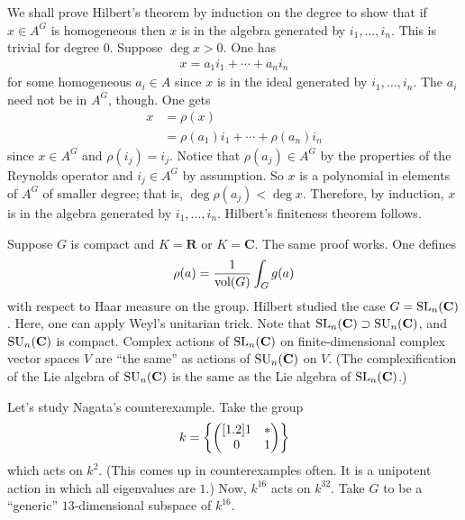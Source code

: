 \documentclass[11pt, oneside,margin=1in]{article}
\begin{document}
We shall prove Hilbert's theorem by induction on the degree to show that if $x\in A^G$ is homogeneous then $x$ is in the algebra generated by $i_1,\hdots,i_n$. This is trivial for degree $0$. Suppose $\deg x > 0$. One has
\begin{align*}
	x=a_1i_1 + \cdots +a_ni_n
\end{align*}
for some homogeneous $a_i\in A$ since $x$ is in the ideal generated by $i_1,\hdots, i_n$. The $a_i$ need not be in $A^G$, though. One gets
\begin{align*}
	x &= \rho(x)\\ 
	  &= \rho(a_1)i_1 + \cdots +\rho(a_n)i_n
\end{align*}
since $x\in A^G$ and $\rho(i_j)=i_j$. Notice that $\rho(a_j) \in A^G$ by the properties of the Reynolds operator and $i_j\in A^G$ by assumption. So $x$ is a polynomial in elements of $A^G$ of smaller degree; that is, $\deg \rho(a_j)<\deg x$. Therefore, by induction, $x$ is in the algebra generated by $i_1,\hdots, i_n$. Hilbert's finiteness theorem follows.

Suppose $G$ is compact and $K=\mathbf{R}$ or $K=\mathbf{C}$. The same proof works. One defines 
\begin{align*}
	\rho(a) = \frac{1}{\operatorname{vol} (G)}\int_{G}^{} g(a) 
\end{align*}		
with respect to Haar measure on the group. Hilbert studied the case $G=\operatorname{SL}_{n}(\mathbf{C})$. Here, one can apply Weyl's unitarian trick. Note that $\operatorname{SL}_{n}(\mathbf{C})\supset \operatorname{SU}_n(\mathbf{C})$, and $\operatorname{SU}_n(\mathbf{C})$ is compact. Complex actions of $\operatorname{SL}_{n}(\mathbf{C})$ on finite-dimensional complex vector spaces $V$ are ``the same'' as actions of $\operatorname{SU}_n(\mathbf{C})$ on $V$. (The complexification of the Lie algebra of $\operatorname{SU}_n(\mathbf{C})$ is the same as the Lie algebra of $\operatorname{SL}_{n}(\mathbf{C})$.) 

Let's study Nagata's counterexample. Take the group
\begin{align*}
	k = \left\{ \begin{pmatrix} [ 1.2 ] 1&*\\0&1\end{pmatrix} \right\} 
\end{align*}
which acts on $k^2$. (This comes up in counterexamples often. It is a unipotent action in which all eigenvalues are $1$.) Now, $k^{16}$ acts on $k^{32}$. Take $G$ to be a ``generic'' $13$-dimensional subspace of $k^{16}$. 
\end{document}
